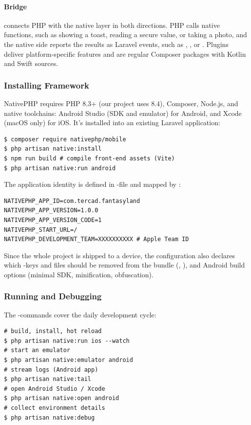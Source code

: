 \paragraph{Bridge} connects PHP with the native layer in both directions. PHP calls native
functions, such as showing a toast, reading a secure value, or taking a photo, and the native
side reports the results as Laravel events, such as , , or
. Plugins deliver platform-specific features and are regular Composer packages with
Kotlin and Swift sources.


\subsubsection{Installing Framework}

NativePHP requires PHP 8.3+ (our project uses 8.4), Composer, Node.js, and native toolchains:
Android Studio (SDK and emulator) for Android, and Xcode (macOS only) for iOS. It's installed
into an existing Laravel application:

\begin{lstlisting}[language=terminal]
$ composer require nativephp/mobile
$ php artisan native:install
$ npm run build # compile front-end assets (Vite)
$ php artisan native:run android
\end{lstlisting}

\noindent The application identity is defined in -file and mapped by
:

\begin{lstlisting}[language=terminal]
NATIVEPHP_APP_ID=com.tercad.fantasyland
NATIVEPHP_APP_VERSION=1.0.0
NATIVEPHP_APP_VERSION_CODE=1
NATIVEPHP_START_URL=/
NATIVEPHP_DEVELOPMENT_TEAM=XXXXXXXXXX # Apple Team ID
\end{lstlisting}

\noindent Since the whole project is shipped to a device, the configuration also declares which
-keys and files should be removed from the bundle (,
), and Android build options (minimal SDK, minification, obfuscation).


\subsubsection{Running and Debugging}

The -commands cover the daily development cycle:

\begin{lstlisting}[language=terminal]
# build, install, hot reload
$ php artisan native:run ios --watch
# start an emulator
$ php artisan native:emulator android
# stream logs (Android app)
$ php artisan native:tail
# open Android Studio / Xcode
$ php artisan native:open android
# collect environment details
$ php artisan native:debug
\end{lstlisting}


